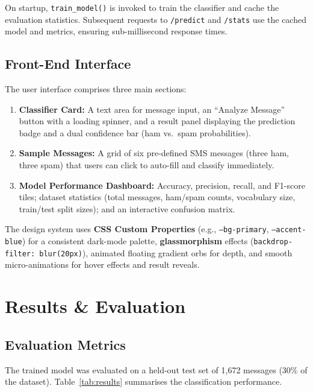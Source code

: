 \documentclass[paper=a4, fontsize=11pt]{scrartcl}
\numberwithin{equation}{section}
\numberwithin{figure}{section}
\numberwithin{table}{section}
\begin{document}
On startup, \texttt{train\_model()} is invoked to train the classifier and cache the evaluation statistics.  Subsequent requests to \texttt{/predict} and \texttt{/stats} use the cached model and metrics, ensuring sub-millisecond response times.

\subsection{Front-End Interface}
The user interface comprises three main sections:

\begin{enumerate}
    \item \textbf{Classifier Card:} A text area for message input, an ``Analyze Message'' button with a loading spinner, and a result panel displaying the prediction badge and a dual confidence bar (ham vs.\ spam probabilities).
    \item \textbf{Sample Messages:} A grid of six pre-defined SMS messages (three ham, three spam) that users can click to auto-fill and classify immediately.
    \item \textbf{Model Performance Dashboard:} Accuracy, precision, recall, and F1-score tiles; dataset statistics (total messages, ham/spam counts, vocabulary size, train/test split sizes); and an interactive confusion matrix.
\end{enumerate}

The design system uses \textbf{CSS Custom Properties} (e.g., \texttt{--bg-primary}, \texttt{--accent-blue}) for a consistent dark-mode palette, \textbf{glassmorphism} effects (\texttt{backdrop-filter: blur(20px)}), animated floating gradient orbs for depth, and smooth micro-animations for hover effects and result reveals.



\section{Results \& Evaluation}

\subsection{Evaluation Metrics}
The trained model was evaluated on a held-out test set of 1,672 messages (30\% of the dataset).  Table~\ref{tab:results} summarises the classification performance.
\end{document}
